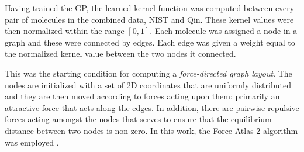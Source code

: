 Having trained the GP, the learned kernel function was computed between every
pair of molecules in the combined data, NIST and Qin. These kernel values were
then normalized within the range $[0, 1]$. Each molecule was assigned a node in
a graph and these were connected by edges. Each edge was given a weight equal to
the normalized kernel value between the two nodes it connected.

This was the starting condition for computing a \emph{force-directed graph
    layout}. The nodes are initialized with a set of 2D coordinates that are
uniformly distributed and they are then moved according to forces acting upon them;
primarily an attractive force that acts along the edges. In addition, there are
pairwise repulsive forces acting amongst the nodes that serves to ensure that
the equilibrium distance between two nodes is non-zero. In this work, the Force
Atlas 2 algorithm was employed
\cite{jacomyForceAtlas2ContinuousGraph2014,bastianGephiOpenSource2009}.